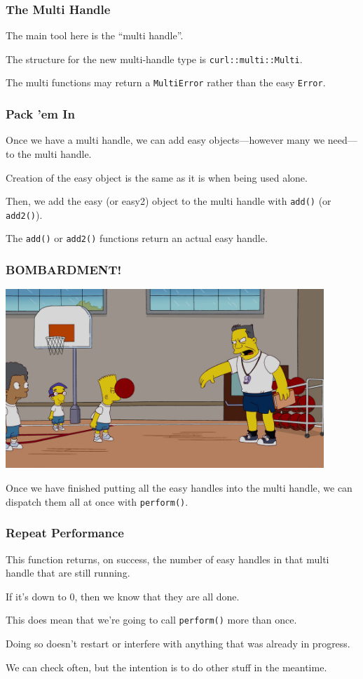 \begin{frame}
\frametitle{The Multi Handle}

The main tool here is the ``multi handle''.

The structure for the new multi-handle type is \texttt{curl::multi::Multi}.

The multi functions may return a \texttt{MultiError} rather than the easy \texttt{Error}.

\end{frame}


\begin{frame}
\frametitle{Pack 'em In}

Once we have a multi handle, we can add easy objects---however many we need---to the multi handle. 

Creation of the easy object is the same as it is when being used alone.

Then, we add the easy (or easy2) object to the multi handle with \texttt{add()} (or \texttt{add2()}). 

The \texttt{add()} or \texttt{add2()} functions return an actual easy handle.
\end{frame}


\begin{frame}
\frametitle{BOMBARDMENT!}

\begin{center}
	\includegraphics[width=0.9\textwidth]{images/bombardment.png}
\end{center}

Once we have finished putting all the easy handles into the multi handle, we can dispatch them all at once with \texttt{perform()}.

\end{frame}


\begin{frame}
\frametitle{Repeat Performance}

This function returns, on success, the number of easy handles in that multi handle that are still running. 

If it's down to 0, then we know that they are all done.

This does mean that we're going to call \texttt{perform()} more than once. 

Doing so doesn't restart or interfere with anything that was already in progress.

We can check often, but the intention is to do other stuff in the meantime.

\end{frame}



